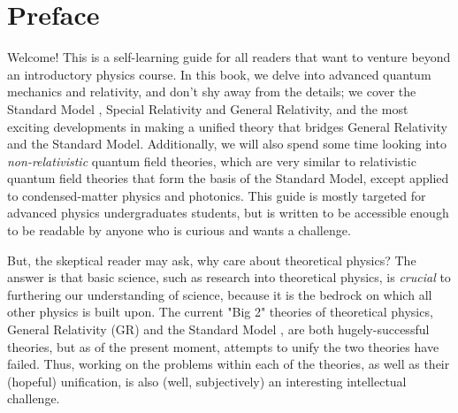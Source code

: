 \documentclass[letterpaper,11pt,twoside,headsepline,bibliography=totoc,index=totoc]{scrbook}
\begin{document}
\title{\normalfont \uppercase{}}
\subtitle{\small A rigorous self-paced guide to Special and General Relativity, Particle Physics, String Theory, and Quantum Gravity}
\author{\small {}}
\date{\normalfont \small{February, 2025}}

\lowertitleback{We dedicate this work to the public domain. We make this dedication for the benefit of the public at large and to the detriment of our heirs and successors. We intend this
dedication to be an overt act of relinquishment in perpetuity of all present and future rights to this work under copyright law.\\\\Jacky Song, Alex Weiss, 2025}

\maketitle



\chapter{Preface}

Welcome! This is a self-learning guide for all readers that want to venture beyond an introductory physics course. In this book, we delve into advanced quantum mechanics and relativity, and don't shy away from the details; we cover the Standard Model , Special Relativity and General Relativity, and the most exciting developments in making a unified theory that bridges General Relativity and the Standard Model. Additionally, we will also spend some time looking into \textit{non-relativistic} quantum field theories, which are very similar to relativistic quantum field theories that form the basis of the Standard Model, except applied to condensed-matter physics and photonics. This guide is mostly targeted for advanced physics undergraduates students, but is written to be accessible enough to be readable by anyone who is curious and wants a challenge.

But, the skeptical reader may ask, why care about theoretical physics? The answer is that basic science, such as research into theoretical physics, is \emph{crucial} to furthering our understanding of science, because it is the bedrock on which all other physics is built upon. The current "Big 2" theories of theoretical physics, General Relativity (GR)  and the Standard Model , are both hugely-successful theories, but as of the present moment, attempts to unify the two theories have failed. Thus, working on the problems within each of the theories, as well as their (hopeful) unification, is also (well, subjectively) an interesting intellectual challenge.
\end{document}

